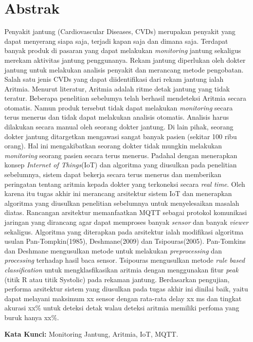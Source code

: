\chapter*{Abstrak}
Penyakit jantung (Cardiovascular Diseases, CVDs) merupakan penyakit yang dapat menyerang siapa saja, terjadi kapan saja dan dimana saja. Terdapat banyak produk di pasaran yang dapat melakukan \textit{monitoring} jantung sekaligus merekam aktivitas jantung penggunanya. Rekam jantung diperlukan oleh dokter jantung untuk melakukan analisis penyakit dan merancang metode pengobatan. Salah satu jenis CVDs yang dapat diidentifikasi dari rekam jantung ialah Aritmia. Menurut literatur, Aritmia adalah ritme detak jantung yang tidak teratur. Beberapa penelitian sebelumya telah berhasil mendeteksi Aritmia secara otomatis.	
Namun produk tersebut tidak dapat melakukan \textit{monitoring} secara terus menerus dan tidak dapat melakukan analisis otomatis. Analisis harus dilakukan secara manual oleh seorang dokter jantung. Di lain pihak, seorang dokter jantung ditargetkan mengawasi sangat banyak pasien (sekitar 100 ribu orang). Hal ini mengakibatkan seorang dokter tidak mungkin melakukan \textit{monitoring} seorang pasien secara terus menerus. Padahal dengan menerapkan konsep \textit{Internet of Things}(IoT) dan algoritma yang diusulkan pada penelitian sebelumnya, sistem dapat bekerja secara terus menerus dan memberikan peringatan tentang aritmia kepada dokter yang terkoneksi secara \textit{real time}.
Oleh karena itu tugas akhir ini merancang arsitektur sistem IoT dan menerapkan algoritma yang diusulkan penelitian sebelumnya untuk menyelesaikan masalah diatas.
Rancangan arsitektur memanfaatkan MQTT sebagai protokol komunikasi jaringan yang dirancang agar dapat memproses banyak \textit{sensor} dan banyak \textit{viewer} sekaligus. Algoritma yang diterapkan pada arsitektur ialah modifikasi algoritma usulan Pan-Tompkin(1985), Deshmane(2009) dan Tsipouras(2005).
Pan-Tomkins dan Deshmane mengusulkan metode untuk melakukan \textit{preprocessing} dan \textit{processing} terhadap hasil baca sensor. Tsipouras mengusulkan metode \textit{rule based classification} untuk mengklasfikasikan aritmia dengan menggunakan fitur \textit{peak} (titik R atau titik Systolic) pada rekaman jantung.
Berdasarkan pengujian, performa arsitektur sistem yang diusulkan pada tugas akhir ini dinilai baik, yaitu dapat melayani maksimum xx sensor dengan rata-rata delay xx ms dan tingkat akurasi xx\% untuk deteksi detak walau deteksi aritmia memiliki perfoma yang buruk hanya xx\%.
  
\vspace{0.5 cm}
\begin{flushleft}
{\textbf{Kata Kunci:} Monitoring Jantung, Aritmia, IoT, MQTT.}
\end{flushleft}